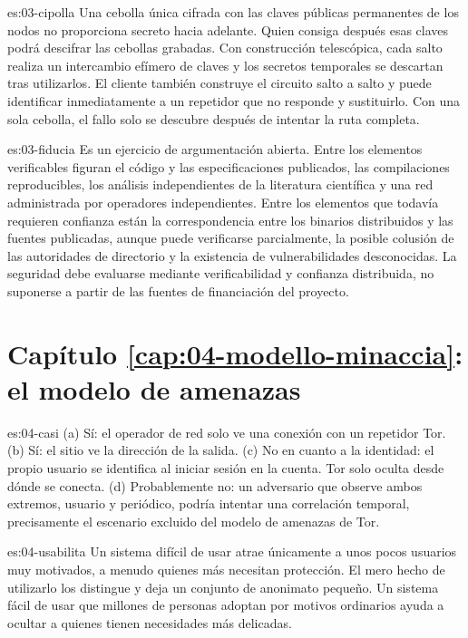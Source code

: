 \begin{soluzione}{es:03-cipolla}
Una cebolla única cifrada con las claves públicas permanentes de los nodos no proporciona secreto hacia adelante. Quien consiga después esas claves podrá descifrar las cebollas grabadas. Con construcción telescópica, cada salto realiza un intercambio efímero de claves y los secretos temporales se descartan tras utilizarlos. El cliente también construye el circuito salto a salto y puede identificar inmediatamente a un repetidor que no responde y sustituirlo. Con una sola cebolla, el fallo solo se descubre después de intentar la ruta completa.
\end{soluzione}

\begin{soluzione}{es:03-fiducia}
Es un ejercicio de argumentación abierta. Entre los elementos verificables figuran el código y las especificaciones publicados, las compilaciones reproducibles, los análisis independientes de la literatura científica y una red administrada por operadores independientes. Entre los elementos que todavía requieren confianza están la correspondencia entre los binarios distribuidos y las fuentes publicadas, aunque puede verificarse parcialmente, la posible colusión de las autoridades de directorio y la existencia de vulnerabilidades desconocidas. La seguridad debe evaluarse mediante verificabilidad y confianza distribuida, no suponerse a partir de las fuentes de financiación del proyecto.
\end{soluzione}

\section*{Capítulo \ref{cap:04-modello-minaccia}: el modelo de amenazas}

\begin{soluzione}{es:04-casi}
(a) Sí: el operador de red solo ve una conexión con un repetidor Tor. (b) Sí: el sitio ve la dirección de la salida. (c) No en cuanto a la identidad: el propio usuario se identifica al iniciar sesión en la cuenta. Tor solo oculta desde dónde se conecta. (d) Probablemente no: un adversario que observe ambos extremos, usuario y periódico, podría intentar una correlación temporal, precisamente el escenario excluido del modelo de amenazas de Tor.
\end{soluzione}

\begin{soluzione}{es:04-usabilita}
Un sistema difícil de usar atrae únicamente a unos pocos usuarios muy motivados, a menudo quienes más necesitan protección. El mero hecho de utilizarlo los distingue y deja un conjunto de anonimato pequeño. Un sistema fácil de usar que millones de personas adoptan por motivos ordinarios ayuda a ocultar a quienes tienen necesidades más delicadas.
\end{soluzione}

